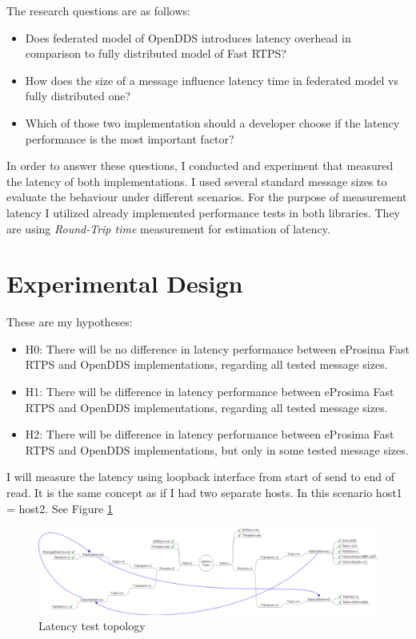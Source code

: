\documentclass{csfourzero}
\begin{document}
The research questions are as follows:
\begin{itemize}
	\item Does federated model of OpenDDS introduces latency overhead in comparison to fully distributed model of Fast RTPS?
	\item How does the size of a message influence latency time in federated model vs fully distributed one?
	\item Which of those two implementation should a developer choose if the latency performance is the most important factor?
\end{itemize}

In order to answer these questions, I conducted and experiment that measured the latency of both implementations. I used several standard message sizes to evaluate the behaviour under different scenarios. For the purpose of measurement latency I utilized already implemented performance tests in both libraries. They are using \textit{Round-Trip time} measurement for estimation of latency. 

\section{Experimental Design}
\label{sec:exp}

\quad These are my hypotheses:
\begin{itemize}
	\item H0: There will be no difference in latency performance between eProsima Fast RTPS and OpenDDS implementations, regarding all tested message sizes.
	\item H1: There will be difference in latency performance between eProsima Fast RTPS and OpenDDS implementations, regarding all tested message sizes.
	\item H2: There will be difference in latency performance between eProsima Fast RTPS and OpenDDS implementations, but only in some tested message sizes.
\end{itemize}

I will measure the latency using loopback interface from start of send to end of read. It is the same concept as if I had two separate hosts. In this scenario host1 = host2. See Figure \ref{fig:test-topology}

\begin{figure}[!h]
	\centering
	\includegraphics[width=1\textwidth]{openDDS-latency-tests}
	\caption{\label{fig:test-topology}Latency test topology
	\cite{openDDS-test-topology}}
\end{figure}
\end{document}
